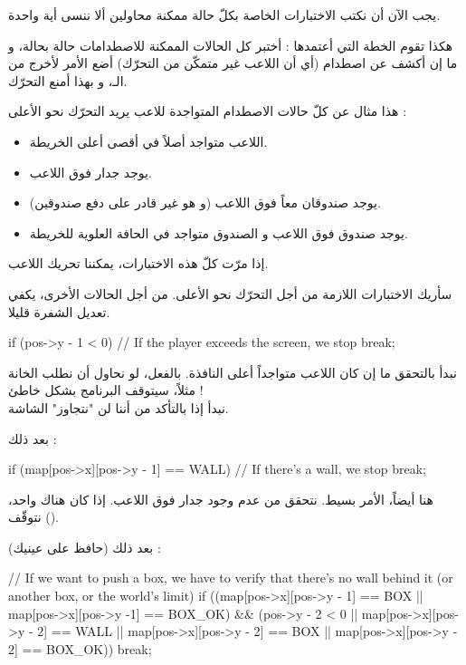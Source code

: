 يجب الآن أن نكتب الاختبارات الخاصة بكلّ حالة ممكنة محاولين ألا ننسى أية واحدة. 

هكذا تقوم الخطة التي أعتمدها : أختبر كل الحالات الممكنة للاصطدامات حالة بحالة، و ما إن أكشف عن اصطدام (أي أن اللاعب غير متمكّن من التحرّك) أضع الأمر
لأخرج من الـ،
و بهذا أمنع التحرّك.

هذا مثال عن كلّ حالات الاصطدام المتواجدة للاعب يريد التحرّك نحو الأعلى :

\begin{itemize}
	\item اللاعب متواجد أصلاً في أقصى أعلى الخريطة.
	\item يوجد جدار فوق اللاعب.
	\item يوجد صندوقان معاً فوق اللاعب (و هو غير قادر على دفع صندوقين).
	\item يوجد صندوق فوق اللاعب و الصندوق متواجد في الحافة العلوية للخريطة.
\end{itemize}

إذا مرّت كلّ هذه الاختبارات، يمكننا تحريك اللاعب. 

سأريك الاختبارات اللازمة من أجل التحرّك نحو الأعلى. من أجل الحالات الأخرى، يكفي تعديل الشفرة قليلا.

\begin{Csource}
if (pos->y - 1 < 0) // If the player exceeds the screen, we stop
	break;
\end{Csource}

نبدأ بالتحقق ما إن كان اللاعب متواجداً أعلى النافذة. بالفعل، لو نحاول أن نطلب الخانة 
مثلاً، سيتوقف البرنامج بشكل خاطئ !\\
نبدأ إذا بالتأكد من أننا لن "نتجاوز" الشاشة.

بعد ذلك :

\begin{Csource}
if (map[pos->x][pos->y - 1] == WALL) // If there's a wall, we stop
	break;
\end{Csource}

هنا أيضاً، الأمر بسيط. نتحقق من عدم وجود جدار فوق اللاعب. إذا كان هناك واحد، نتوقّف
().

بعد ذلك (حافظ على عينيك) : 

\begin{Csource}
// If we want to push a box, we have to verify that there's no wall behind it (or another box, or the world's limit)
if ((map[pos->x][pos->y - 1] == BOX || map[pos->x][pos->y -1] == BOX_OK) && (pos->y - 2 < 0 || map[pos->x][pos->y - 2] == WALL || map[pos->x][pos->y - 2] == BOX || map[pos->x][pos->y - 2] == BOX_OK))
	break;
\end{Csource}

